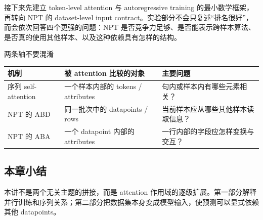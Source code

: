 接下来先建立 token-level attention 与 autoregressive training 的最小数学框架，再转向 NPT 的 dataset-level input contract。实验部分不会只复述“排名很好”，而会依次回答四个更强的问题：NPT 是否竞争力足够、是否能表示跨样本算法、是否真的使用其他样本、以及这种依赖具有怎样的结构。

\begin{knowledgebox}{两条轴不要混淆}
\begin{tabularx}{\textwidth}{L{0.23\textwidth}>{\raggedright\arraybackslash}X >{\raggedright\arraybackslash}X}
\toprule
机制 & 被 attention 比较的对象 & 主要问题 \\
\midrule
序列 self-attention & 一个样本内部的 tokens / attributes & 句内或样本内有哪些元素相关？ \\
NPT 的 ABD & 同一批次中的 datapoints / rows & 当前样本应从哪些其他样本读取信息？ \\
NPT 的 ABA & 一个 datapoint 内部的 attributes & 一行内部的字段应怎样变换与交互？ \\
\bottomrule
\end{tabularx}
\end{knowledgebox}

\subsection{本章小结}

本讲不是两个无关主题的拼接，而是 attention 作用域的逐级扩展。第一部分解释并行训练和序列关系；第二部分把数据集本身变成模型输入，使预测可以显式依赖其他 datapoints。

